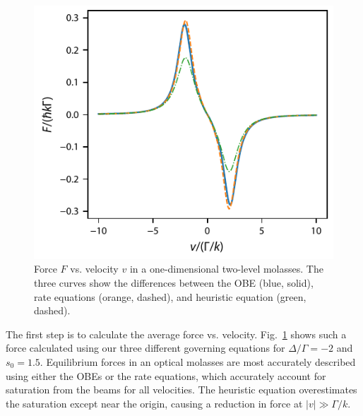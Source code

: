 \documentclass[final,5p,times,twocolumn]{elsarticle}
\begin{document}
\begin{figure}
	\center
	\includegraphics{figs/two_level_molasses_forces.pdf}
	\caption{\label{fig:two_level_molasses_forces} Force $F$ vs. velocity $v$ in a one-dimensional two-level molasses.  The three curves show the differences between the OBE (blue, solid), rate equations (orange, dashed), and heuristic equation (green, dashed).}
\end{figure}

The first step is to calculate the average force vs. velocity.  Fig.~\ref{fig:two_level_molasses_forces} shows such a force calculated using our three different governing equations for $\Delta/\Gamma=-2$ and $s_0=1.5$.  Equilibrium forces in an optical molasses are most accurately described using either the OBEs or the rate equations, which accurately account for saturation from the beams for all velocities.  The heuristic equation overestimates the saturation except near the origin, causing a reduction in force at $|v|\gg \Gamma/k$.  
\end{document}
